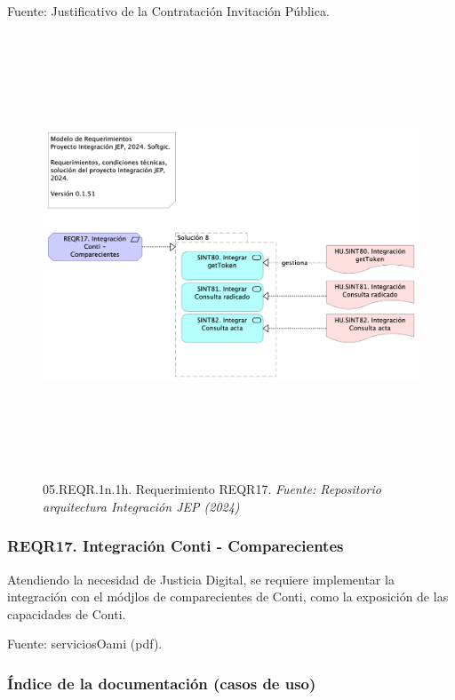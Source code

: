 \documentclass[
  paper=a4,
  ,captions=tableheading
]{scrartcl}
\begin{document}
Fuente: Justificativo de la Contratación Invitación Pública.

\begin{figure}
\centering
\includegraphics[width=\textwidth,height=5.20833in]{images/05.REQR.1n.1h.RequerimientoREQR17.png}
\caption{05.REQR.1n.1h. Requerimiento REQR17. \emph{Fuente: Repositorio
arquitectura Integración JEP
(2024)}}\label{fig:id-fe7030f542c949f8b9a7705815656630}
\end{figure}

\subsubsection{REQR17. Integración Conti -
Comparecientes}\label{sec:reqr17.-integraciuxf3n-conti---comparecientes}

Atendiendo la necesidad de Justicia Digital, se requiere implementar la
integración con el módjlos de comparecientes de Conti, como la
exposición de las capacidades de Conti.

Fuente: serviciosOami (pdf).

\subsubsection{Índice de la documentación (casos de
uso)}\label{sec:uxedndice-de-la-documentaciuxf3n-casos-de-uso}
\end{document}
